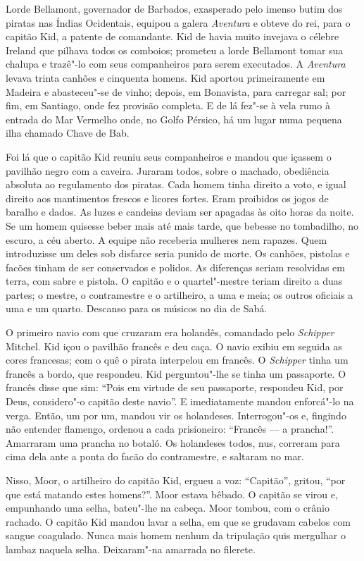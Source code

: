 Lorde Bellamont, governador de Barbados, exasperado pelo imenso butim dos
piratas nas Índias Ocidentais, equipou a galera \textit{Aventura} e obteve
do rei, para o capitão Kid, a patente de comandante. Kid de havia muito
invejava o célebre Ireland que pilhava todos os comboios; prometeu a lorde
Bellamont tomar sua chalupa e trazê"-lo com seus companheiros para serem
executados. A \textit{Aventura} levava trinta canhões e cinquenta homens.
Kid aportou primeiramente em Madeira e abasteceu"-se de vinho; depois, em
Bonavista, para carregar sal; por fim, em Santiago, onde fez provisão
completa. E de lá fez"-se à vela rumo à entrada do Mar Vermelho onde, no
Golfo Pérsico, há um lugar numa pequena ilha chamado Chave de Bab.

Foi lá que o capitão Kid reuniu seus companheiros e mandou que içassem o
pavilhão negro com a caveira. Juraram todos, sobre o machado, obediência
absoluta ao regulamento dos piratas. Cada homem tinha direito a voto, e
igual direito aos mantimentos frescos e licores fortes. Eram proibidos os
jogos de baralho e dados. As luzes e candeias deviam ser apagadas às oito
horas da noite. Se um homem quisesse beber mais até mais tarde, que
bebesse no tombadilho, no escuro, a céu aberto. A equipe não receberia
mulheres nem rapazes. Quem introduzisse um deles sob disfarce seria punido
de morte. Os canhões, pistolas e facões tinham de ser conservados e
polidos. As diferenças seriam resolvidas em terra, com sabre e pistola. O
capitão e o quartel"-mestre teriam direito a duas partes; o mestre, o
contramestre e o artilheiro, a uma e meia; os outros oficiais a uma e um
quarto. Descanso para os músicos no dia de Sabá.

O primeiro navio com que cruzaram era holandês, comandado pelo
\textit{Schipper} Mitchel. Kid içou o pavilhão francês e deu caça. O navio
exibiu em seguida as cores francesas; com o quê o pirata interpelou em
francês. O \textit{Schipper} tinha um francês a bordo, que respondeu. Kid
perguntou"-lhe se tinha um passaporte. O francês disse que sim: “Pois em
virtude de seu passaporte, respondeu Kid, por Deus, considero"-o capitão
deste navio”. E imediatamente mandou enforcá"-lo na verga. Então, um por
um, mandou vir os holandeses. Interrogou"-os e, fingindo não entender
flamengo, ordenou a cada prisioneiro: “Francês --- a prancha!”. Amarraram uma
prancha no botaló. Os holandeses todos, nus, correram para cima dela ante
a ponta do facão do contramestre, e saltaram no mar.

Nisso, Moor, o artilheiro do capitão Kid, ergueu a voz: “Capitão'', gritou,
``por que está matando estes homens?”. Moor estava bêbado. O capitão se virou
e, empunhando uma selha, bateu"-lhe na cabeça. Moor tombou, com o crânio
rachado. O capitão Kid mandou lavar a selha, em que se grudavam cabelos
com sangue coagulado. Nunca mais homem nenhum da tripulação quis mergulhar
o lambaz naquela selha. Deixaram"-na amarrada no filerete.

